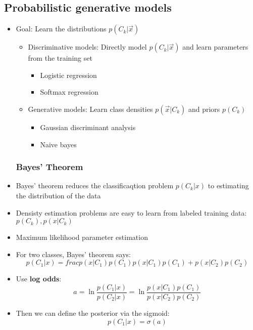 \subsection{Probabilistic generative models}
\begin{itemize}
	\item Goal: Learn the distributions $p(C_k | \vec{x})$
	\begin{itemize}
		\item Discriminative models: Directly model $p(C_k|\vec{x})$ and learn parameters from the training set
		\begin{itemize}
			\item Logistic regression
			\item Softmax regression
		\end{itemize}
		\item Generative models: Learn class densities $p(\vec{x}|C_k)$ and priors $p(C_k)$
		\begin{itemize}
			\item Gaussian discriminant analysis
			\item Naive bayes
		\end{itemize}
	\end{itemize}
	\subsubsection{Bayes' Theorem}
	\item Bayes' theorem reduces the classificaqtion problem $p(C_k|x) $ to estimating the distribution of the data
	\item Densisty estimation problems are easy to learn from labeled training data: $p(C_k), p(x|C_k)$
	\item Maximum likelihood parameter estimation
	\item For two classes, Bayes' theorem says:
		$$p(C_1|x)=frac{p(x|C_1)p(C_1)}{p(x|C_1)p(C_1)+p(x|C_2)p(C_2)}$$
	\item Use \textbf{log odds}:
		$$a=\ln\frac{p(C_1|x)}{p(C_2|x)}=\ln\frac{p(x|C_1)p(C_1)}{p(x|C_2)p(C_2)}$$
	\item Then we can define the posterior via the sigmoid:
		$$p(C_1|x)=\sigma(a)$$
\end{itemize}

